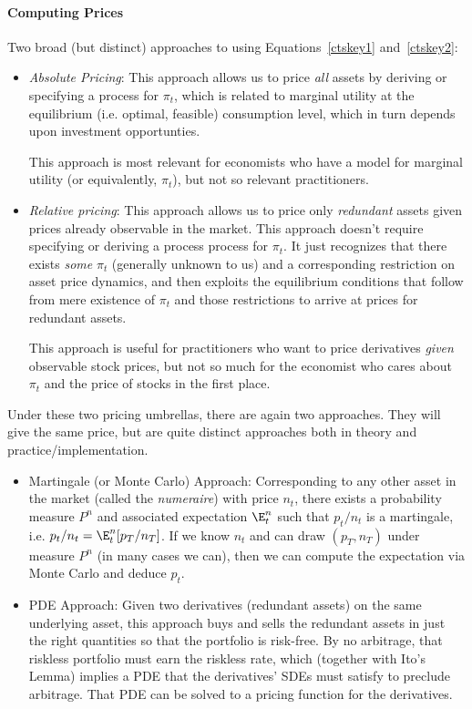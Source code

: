 \documentclass[12pt]{article}
\theoremstyle{plain}
\theoremstyle{definition}
\theoremstyle{remark}
\begin{document}
\paragraph{Computing Prices}
Two broad (but distinct) approaches to using Equations~\ref{ctskey1}
and~\ref{ctskey2}:
\begin{itemize}
  \item \emph{Absolute Pricing}:
    This approach allows us to price \emph{all} assets by deriving or
    specifying a process for $\pi_t$, which is related to marginal
    utility at the equilibrium (i.e. optimal, feasible) consumption
    level, which in turn depends upon investment opportunties.

    This approach is most relevant for economists who have a model for
    marginal utility (or equivalently, $\pi_t$), but not so relevant
    practitioners.

  \item \emph{Relative pricing}:
    This approach allows us to price only \emph{redundant} assets
    given prices already observable in the market.
    This approach doesn't require specifying or deriving a process
    process for $\pi_t$.
    It just recognizes that there exists \emph{some} $\pi_t$ (generally
    unknown to us) and a corresponding restriction on asset price
    dynamics, and then exploits the equilibrium conditions that
    follow from mere existence of $\pi_t$ and those restrictions to
    arrive at prices for redundant assets.

    This approach is useful for practitioners who want to price
    derivatives \emph{given} observable stock prices, but not so much
    for the economist who cares about $\pi_t$ and the price of stocks in
    the first place.
\end{itemize}
Under these two pricing umbrellas, there are again two approaches.
They will give the same price, but are quite distinct approaches
both in theory and practice/implementation.
\begin{itemize}
  \item Martingale (or Monte Carlo) Approach:
    Corresponding to any other asset in the market (called the
    \emph{numeraire}) with price $n_t$,
    there exists a probability measure $P^n$ and associated
    expectation $\E_t^n$ such that $p_t/n_t$ is a martingale, i.e.
    $p_t/n_t = \E_t^n[p_T/n_T]$.
    If we know $n_t$ and can draw $(p_T,n_T)$ under measure $P^n$
    (in many cases we can), then we can compute the expectation via
    Monte Carlo and deduce $p_t$.

  \item PDE Approach:
    Given two derivatives (redundant assets) on the same underlying
    asset, this approach buys and sells the redundant assets in just
    the right quantities so that the portfolio is risk-free.
    By no arbitrage, that riskless portfolio must earn the riskless
    rate, which (together with Ito's Lemma) implies a PDE that the
    derivatives' SDEs must satisfy to preclude arbitrage.
    That PDE can be solved to a pricing function for the derivatives.
\end{itemize}
\end{document}
